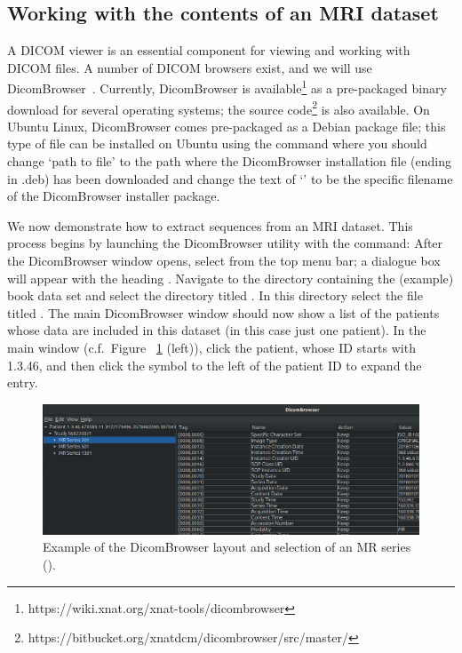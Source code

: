 \subsection{Working with the contents of an MRI dataset}
\label{sec:chp2:viewmri}

A DICOM viewer is an essential component for viewing and working with
DICOM files. A number of DICOM browsers exist, and we will use
DicomBrowser~\cite{dicombrowser}.  Currently, DicomBrowser is
available\footnote{https://wiki.xnat.org/xnat-tools/dicombrowser} as a
pre-packaged binary download for several operating systems; the source
code\footnote{https://bitbucket.org/xnatdcm/dicombrowser/src/master/}
is also available. On Ubuntu Linux, DicomBrowser comes pre-packaged
as a Debian package file; this type of file can be installed on
Ubuntu using the command 
\noindent where you should change `path to file' to the path where the  
DicomBrowser installation file (ending in .deb) has been downloaded and change 
the text of `' to be the specific filename of the 
DicomBrowser installer package. 

We now demonstrate how to extract sequences from an MRI dataset. This
process begins by launching the DicomBrowser utility with the 
command: 
\noindent After the DicomBrowser window opens, select
 from the top menu bar; a dialogue box
will appear with the heading . Navigate to
the directory containing the (example) book data set and select the directory
titled \emp{\erniedicom}.  In this directory select the file titled
. The main DicomBrowser window should now show a list of
the patients whose data are included in this dataset (in this case
just one patient).  In the main window (c.f.~Figure~%
\ref{fig:chp2:dicombrwsr-scr} (left)), click the patient, whose ID starts with 
1.3.46, and then click the symbol to the left of the patient ID to expand the 
entry.

\begin{figure}[h]
  \centering
  \includegraphics[width=\textwidth]{./graphics/chp2/dicombrowser-d-ext}
  \caption{Example of the DicomBrowser layout and selection of an MR series (\emp{\erniedicom}).} 
  \label{fig:chp2:dicombrwsr-scr}
\end{figure}

